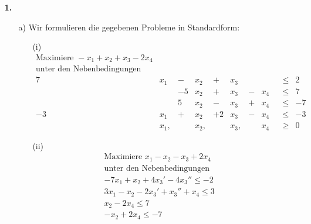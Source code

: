 \documentclass [a4paper,11pt]{article}
\author{\authorinfotitle}
\title{\titleinfo}
\date{\today}
\begin{document}
\maketitle
    \begin{enumerate}
        \item[\textbf{1.}]
            \begin{enumerate}
                \item[a)]
                    Wir formulieren die gegebenen Probleme in Standardform:
                    \begin{enumerate}
                        \item[(i)]
                            \begin{align*}
                                \text{Maximiere } -x_1 + x_2 + x_3 - 2x_4 \\
                                \text{unter den Nebenbedingungen}\\
                                7&x_1& - &x_2& + &x_3& && &\leq& 2\\
                                && -5&x_2& + &x_3& - &x_4& &\leq& 7\\
                                && 5&x_2& - &x_3& + &x_4& &\leq& -7\\
                                -3&x_1& + &x_2& + 2&x_3& - &x_4& &\leq& -3\\
                                &x_1,&&x_2,&&x_3,&&x_4& &\geq& 0
                            \end{align*}
                        \item[(ii)]
                            \begin{align*}
                                \text{Maximiere } x_1 - x_2 - x_3 +2x_4\\
                                \text{unter den Nebenbedingungen}\\
                                -7x_1 + x_2 + 4x_3' - 4x_3'' \leq -2\\
                                3x_1 - x_2 - 2x_3' + x_3'' + x_4 \leq 3\\
                                x_2 - 2x_4 \leq 7\\
                                -x_2 + 2x_4 \leq -7\\

\end{align*}
\end{enumerate}
\end{enumerate}
\end{enumerate}
\end{document}
